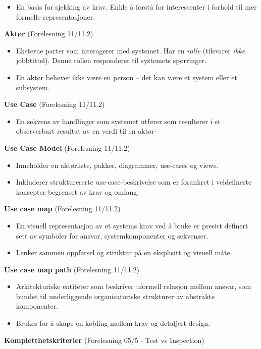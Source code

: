 \begin{itemize}
\item
  En basis for sjekking av krav. Enkle å forstå for interessenter i
  forhold til mer formelle representasjoner.
\end{itemize}
\textbf{Aktør} (Forelesning 11/11.2)

\begin{itemize}
\item
  Eksterne parter som interagerer med systemet. Har en \emph{rolle}
  (tilsvarer \emph{ikke} jobbtittel). Denne rollen responderer til
  systemets spørringer.
\item
  En aktør behøver ikke være en person -- det kan være et system eller
  et subsystem.
\end{itemize}
\textbf{Use Case} (Forelesning 11/11.2)

\begin{itemize}
\item
  En sekvens av handlinger som systemet utfører som resulterer i et
  observerbart resultat av en verdi til en aktør-
\end{itemize}
\textbf{Use Case Model} (Forelesning 11/11.2)

\begin{itemize}
\item
  Inneholder en aktørliste, pakker, diagrammer, use-cases og views.
\item
  Inkluderer strukturererte use-case-beskrivelse som er forankret i
  veldefinerte konsepter begrenset av krav og omfang.
\end{itemize}
\textbf{Use case map} (Forelesning 11/11.2)

\begin{itemize}
\item
  En visuell representasjon av et systems krav ved å bruke er presist
  definert sett av symboler for ansvar, systemkomponenter og sekvenser.
\item
  Lenker sammen oppførsel og struktur på en eksplisitt og visuell måte.
\end{itemize}
\textbf{Use case map path} (Forelesning 11/11.2)

\begin{itemize}
\item
  Arkitekturiske entiteter som beskriver uformell relasjon mellom
  ansvar, som bundet til underliggende organisatoriske strukturer av
  abstrakte komponenter.
\item
  Brukes for å skape en kobling mellom krav og detaljert design.
\end{itemize}
\textbf{Kompletthetskriterier} (Forelesning 05/5 - Test vs Inspection)

